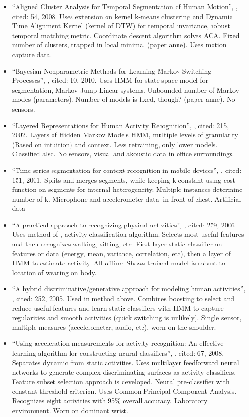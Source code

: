 \begin{itemize}
  \item ``Aligned Cluster Analysis for Temporal Segmentation of Human Motion'', \cite{zhou2008aligned}, cited: 54, 2008. Uses extension on kernel k-means clustering and Dynamic Time Alignment Kernel (kernel of DTW) for temporal invariance, robust temporal matching metric. Coordinate descent algorithm solves ACA. Fixed number of clusters, trapped in local minima. (paper anne). Uses motion capture data.
  \item ``Bayesian Nonparametric Methods for Learning Markov Switching Processes'', \cite{fox2010bayesian}, cited: 10, 2010. Uses HMM for state-space model for segmentation, Markov Jump Linear systems. Unbounded number of Markov modes (parameters). Number of models is fixed, though? (paper anne). No sensors.
  \item ``Layered Representations for Human Activity Recognition'', \cite{oliver2002layered}, cited: 215, 2002. Layers of Hidden Markov Models HMM, multiple levels of granularity (Based on intuition) and context. Less retraining, only lower models. Classified also. No sensors, visual and akoustic data in office surroundings.
  \item ``Time series segmentation for context recognition in mobile devices'', \cite{himberg2001time}, cited: 151, 2001. Splits and merges segments, while keeping k constant using cost function on segments for internal heterogeneity. Multiple instances determine number of k. Microphone and accelerometer data, in front of chest. Artificial data
  \item ``A practical approach to recognizing physical activities'', \cite{lester2006practical}, cited: 259, 2006. Uses method of \cite{lester2005hybrid}, activity classification algorithm. Selects most useful features and then recognizes walking, sitting, etc. First layer static classifier on features or data (energy, mean, variance, correlation, etc), then a layer of HMM to estimate activity. All offline. Shows trained model is robust to location of wearing on body.
  \item ``A hybrid discriminative/generative approach for modeling human activities'', \cite{lester2005hybrid}, cited: 252, 2005. Used in method above. Combines boosting to select and reduce useful features and learn static classifiers with HMM to capture regularities and smooth activities (quick switching is unlikely). Single sensor, multiple measures (accelerometer, audio, etc), worn on the shoulder.
  \item ``Using acceleration measurements for activity recognition: An effective learning algorithm for constructing neural classifiers'', \cite{yang2008using}, cited: 67, 2008. Separates dynamic from static activities. Uses multilayer feedforward neural networks to generate complex discriminating surfaces as activity classifiers. Feature subset selection approach is developed. Neural pre-classifier with constant threshold criterion. Uses Common Principal Component Analysis. Recognizes eight activities with 95\% overall accuracy. Laboratory environment. Worn on dominant wrist.

\end{itemize}

